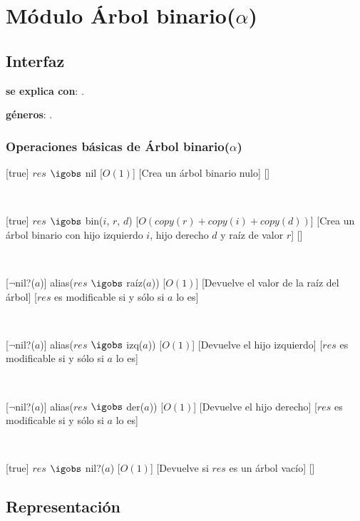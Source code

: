 \section{Módulo Árbol binario($\alpha$)}

\subsection{Interfaz}

\textbf{se explica con}: .

\textbf{géneros}: .

\subsubsection{Operaciones básicas de Árbol binario($\alpha$)}

	[true]
	{$res$ $\igobs$ nil}%
	[$O(1)$]
	[Crea un árbol binario nulo]
	[]

	~

	[true]
	{$res$ $\igobs$ bin($i$, $r$, $d$)}%
	[$O(copy(r) + copy(i) + copy(d))$]
	[Crea un árbol binario con hijo izquierdo $i$, hijo derecho $d$ y raíz de valor $r$]
	[]

	~

	[$\neg$nil?($a$)]
	{alias($res$ $\igobs$ raíz($a$))}%
	[$O(1)$]
	[Devuelve el valor de la raíz del árbol]
	[$res$ es modificable si y sólo si $a$ lo es]

	~

	[$\neg$nil?($a$)]
	{alias($res$ $\igobs$ izq($a$))}%
	[$O(1)$]
	[Devuelve el hijo izquierdo]
	[$res$ es modificable si y sólo si $a$ lo es]

	~

	[$\neg$nil?($a$)]
	{alias($res$ $\igobs$ der($a$))}%
	[$O(1)$]
	[Devuelve el hijo derecho]
	[$res$ es modificable si y sólo si $a$ lo es]

	~

	[true]
	{$res$ $\igobs$ nil?($a$)}%
	[$O(1)$]
	[Devuelve  si $res$ es un árbol vacío]
	[]

\subsection{Representación}

